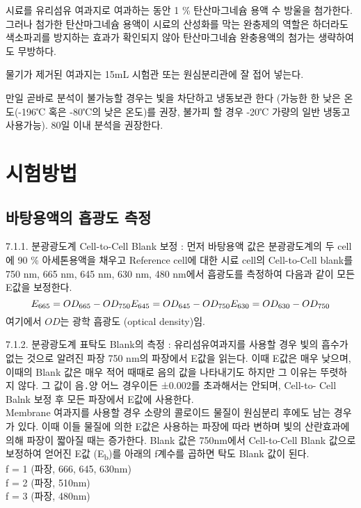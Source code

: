 \documentclass[
]{book}
\begin{document}
시료를 유리섬유 여과지로 여과하는 동안 1 \% 탄산마그네슘 용액 수 방울을 첨가한다. 그러나 첨가한 탄산마그네슘 용액이 시료의 산성화를 막는 완충제의 역할은 하더라도 색소파괴를 방지하는 효과가 확인되지 않아 탄산마그네슘 완충용액의 첨가는 생략하여도 무방하다.

물기가 제거된 여과지는 15mL 시험관 또는 원심분리관에 잘 접어 넣는다.

만일 곧바로 분석이 불가능할 경우는 빛을 차단하고 냉동보관 한다 (가능한 한 낮은 온도(-196℃ 혹은 -80℃의 낮은 온도)를 권장, 불가피 할 경우 -20℃ 가량의 일반 냉동고 사용가능). 80일 이내 분석을 권장한다.

\hypertarget{uxc2dcuxd5d8uxbc29uxbc95-2}{%
\section{시험방법}\label{uxc2dcuxd5d8uxbc29uxbc95-2}}

\hypertarget{uxbc14uxd0d5uxc6a9uxc561uxc758-uxd761uxad11uxb3c4-uxce21uxc815}{%
\subsection{바탕용액의 흡광도 측정}\label{uxbc14uxd0d5uxc6a9uxc561uxc758-uxd761uxad11uxb3c4-uxce21uxc815}}

7.1.1. 분광광도계 Cell-to-Cell Blank 보정 : 먼저 바탕용액 값은 분광광도계의 두 cell에 90 \% 아세톤용액을 채우고 Reference cell에 대한 시료 cell의 Cell-to-Cell blank를 750 nm, 665 nm, 645 nm, 630 nm, 480 nm에서 흡광도를 측정하여 다음과 같이 모든 E값을 보정한다.\\
\[E_{665}=OD_{665} - OD_{750}\\
E_{645}=OD_{645} - OD_{750}\\
E_{630}=OD_{630} - OD_{750}\]
여기에서 \(OD\)는 광학 흡광도 (optical density)임.

7.1.2. 분광광도계 표탁도 Blank의 측정 : 유리섬유여과지를 사용할 경우 빛의 흡수가 없는 것으로 알려진 파장 750 nm의 파장에서 E값을 읽는다. 이때 E값은 매우 낮으며, 이때의 Blank 값은 매우 적어 때때로 음의 값을 나타내기도 하지만 그 이유는 뚜렷하지 않다. 그 값이 음․양 어느 경우이든 ±0.002를 초과해서는 안되며, Cell-to- Cell Balnk 보정 후 모든 파장에서 E값에 사용한다.\\
Membrane 여과지를 사용할 경우 소량의 콜로이드 물질이 원심분리 후에도 남는 경우가 있다. 이때 이들 물질에 의한 E값은 사용하는 파장에 따라 변하며 빛의 산란효과에 의해 파장이 짧아질 때는 증가한다. Blank 값은 750nm에서 Cell-to-Cell Blank 값으로 보정하여 얻어진 E값 (E\textsubscript{b})를 아래의 f계수를 곱하면 탁도 Blank 값이 된다.\\
f = 1 (파장, 666, 645, 630nm)\\
f = 2 (파장, 510nm)\\
f = 3 (파장, 480nm)
\end{document}

